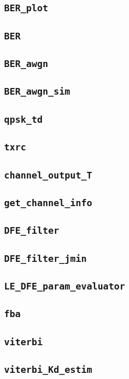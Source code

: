 \documentclass[10pt]{article}
\numberwithin{equation}{section}
\begin{document}
\subsection*{\texttt{BER\_plot}}

\subsection*{\texttt{BER}}

\subsection*{\texttt{BER\_awgn}}

\subsection*{\texttt{BER\_awgn\_sim}}
 
\subsection*{\texttt{qpsk\_td}}
 \pagebreak

\subsection*{\texttt{txrc}}

\subsection*{\texttt{channel\_output\_T}}
 \pagebreak
\subsection*{\texttt{get\_channel\_info}}
 
\subsection*{\texttt{DFE\_filter}}

\subsection*{\texttt{DFE\_filter\_jmin}}

\subsection*{\texttt{LE\_DFE\_param\_evaluator}}
 \pagebreak
\subsection*{\texttt{fba}}

\subsection*{\texttt{viterbi}}
 
\subsection*{\texttt{viterbi\_Kd\_estim}}

\end{document}
